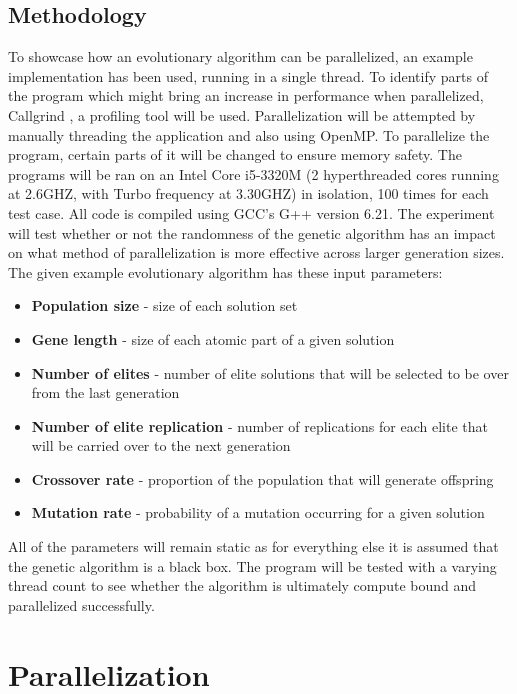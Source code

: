 \documentclass[journal,transmag]{IEEEtran}
\begin{document}
\subsection{Methodology}
        To showcase how an evolutionary algorithm can be parallelized, an example implementation
        has been used, running in a single thread. To identify parts of the program which might
        bring an increase in performance when parallelized, Callgrind \cite{callgrind}, a profiling tool will be 
        used. Parallelization will be attempted by manually threading the application and also 
        using OpenMP. To parallelize the program, certain parts of it will be changed to ensure
        memory safety. The programs will be ran on an Intel Core i5-3320M (2 hyperthreaded cores
        running at 2.6GHZ, with Turbo frequency at 3.30GHZ) in isolation, 100 times
        for each test case. All code is compiled using GCC's G++ version 6.21. The experiment will
        test whether or not the randomness of the genetic algorithm has an impact on what method
        of parallelization is more effective across larger generation sizes.
        The given example evolutionary algorithm has these input parameters:
        \begin{itemize}
            \item \textbf{Population size} - size of each solution set
            \item \textbf{Gene length} - size of each atomic part of a given solution
            \item \textbf{Number of elites} - number of elite solutions that will be selected to be over from the last generation
            \item \textbf{Number of elite replication} - number of replications for each elite that will be carried over to the next generation
            \item \textbf{Crossover rate} - proportion of the population that will generate offspring
            \item \textbf{Mutation rate} - probability of a mutation occurring for a given solution
        \end{itemize}
        All of the parameters will remain static as for everything else it is assumed that the genetic 
        algorithm is a black box. The program will be tested with a varying thread count to 
        see whether the algorithm is ultimately compute bound and parallelized successfully.


\section{Parallelization}
\end{document}
